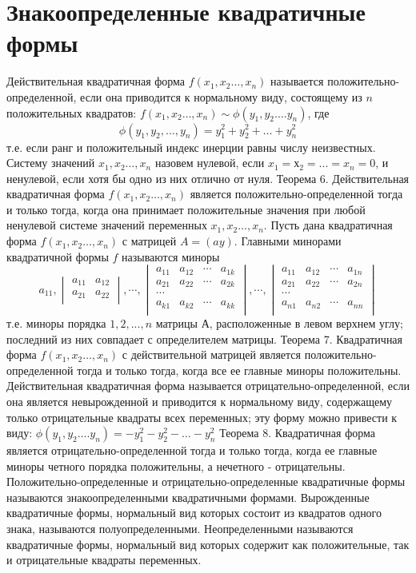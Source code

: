 \documentclass[a4paper,14pt]{report}
\newcommand\tab[1][1cm]{\hspace*{#1}}
\newcommand{\tl}{\newline\tab}
\begin{document}
\section{Знакоопределенные квадратичные формы}
\tab Действительная квадратичная форма $f(x_1,x_2…,x_n)$ называется положительно-определенной, если она приводится к нормальному виду, состоящему из $n$ положительных квадратов: $f(x_1,x_2…,x_n) \sim \phi(y_1,y_2….y_n)$, где \newline
$$\phi(y_1,y_2, … ,y_n)=y_1^2+y_2^2+…+y_n^2$$ т.е. если ранг и положительный индекс инерции равны числу неизвестных.
\tl
Систему значений $x_1,x_2…,x_n$ назовем нулевой, если $x_1 = х_2 = ... = x_n = 0$, и ненулевой, если хотя бы одно из них отлично от нуля.
\tl
Теорема 6. Действительная квадратичная форма $f(x_1,x_2…,x_n)$ является положительно-определенной тогда и только тогда, когда она принимает положительные значения при любой ненулевой системе значений переменных $x_1,x_2…,x_n$.
\tl Пусть дана квадратичная форма $f(x_1,x_2…,x_n)$ с матрицей $A = (ay)$. Главными минорами квадратичной формы $f$ называются миноры  
$$a_{11}, 
\begin{vmatrix}
a_{11} & a_{12} \\ 
a_{21} & a_{22} \\ 
\end{vmatrix},
\cdots
,
\begin{vmatrix}
a_{11} & a_{12} & \cdots & a_{1k} \\ 
a_{21} & a_{22} & \cdots & a_{2k} \\ 
\cdots \\
a_{k1} & a_{k2} & \cdots & a_{kk} \\ 
\end{vmatrix}
,
\cdots
,
\begin{vmatrix}
a_{11} & a_{12} & \cdots & a_{1n} \\ 
a_{21} & a_{22} & \cdots & a_{2n} \\ 
\cdots \\
a_{n1} & a_{n2} & \cdots & a_{nn} \\ 
\end{vmatrix}
$$
\tab т.е. миноры порядка $1, 2, ... , n$ матрицы $А$, расположенные в левом верхнем углу; последний из них совпадает с определителем матрицы.
\tl
Теорема 7. Квадратичная форма $f(x_1,x_2…,x_n)$ с действительной матрицей является положительно-определенной тогда и только тогда, когда все ее главные миноры положительны.
\tl
Действительная квадратичная форма называется отрицательно-определенной, если она является невырожденной и приводится к нормальному виду, содержащему только отрицательные квадраты всех переменных; эту форму можно привести к виду:
$\phi(y_1,y_2….y_n)= -y_{1}^2-y_{2}^2 -…- y_{n}^2$
\tl
Теорема 8. Квадратичная форма является отрицательно-определенной тогда и только тогда, когда ее главные миноры четного порядка положительны, а нечетного - отрицательны.
\tl
Положительно-определенные и отрицательно-определенные квадратичные формы называются знакоопределенными квадратичными формами.
\tl
Вырожденные квадратичные формы, нормальный вид которых состоит из квадратов одного знака, называются полуопределенными. Неопределенными называются квадратичные формы, нормальный вид которых содержит как положительные, так и отрицательные квадраты переменных.
\end{document}
